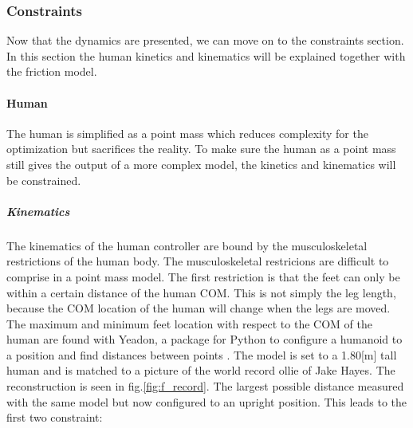 \subsubsection{Constraints}
\noindent Now that the dynamics are presented, we can move on to the constraints section. In this section the human kinetics and kinematics will be explained together with the friction model. 

\paragraph{Human}
\noindent The human is simplified as a point mass which reduces complexity for the optimization but sacrifices the reality. To make sure the human as a point mass still gives the output of a more complex model, the kinetics and kinematics will be constrained. 
\subparagraph{Kinematics}
\noindent The kinematics of the human controller are bound by the musculoskeletal restrictions of the human body. The musculoskeletal restricions are difficult to comprise in a point mass model. The first restriction is that the feet can only be within a certain distance of the human COM. This is not simply the leg length, because the COM location of the human will change when the legs are moved. The maximum and minimum feet location with respect to the COM of the human are found with Yeadon, a package for Python to configure a humanoid to a position and find distances between points \cite{yeadon_simulation_1990}. The model is set to a 1.80[m] tall human and is matched to a picture of the world record ollie of Jake Hayes. The reconstruction is seen in fig.\ref{fig:f_record}. The largest possible distance measured with the same model but now configured to an upright position. This leads to the first two constraint:


